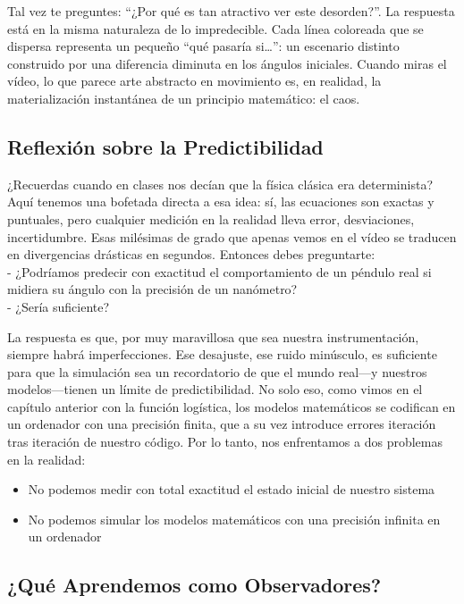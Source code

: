 \documentclass[
  11pt,
  a4paper,
  DIV=11,
  numbers=noendperiod]{scrreprt}
\providecommand{\tightlist}{%
  \setlength{\itemsep}{0pt}\setlength{\parskip}{0pt}}
\begin{document}
Tal vez te preguntes: ``¿Por qué es tan atractivo ver este desorden?''.
La respuesta está en la misma naturaleza de lo impredecible. Cada línea
coloreada que se dispersa representa un pequeño ``qué pasaría
si\ldots{}'': un escenario distinto construido por una diferencia
diminuta en los ángulos iniciales. Cuando miras el vídeo, lo que parece
arte abstracto en movimiento es, en realidad, la materialización
instantánea de un principio matemático: el caos.

\subsection{Reflexión sobre la
Predictibilidad}\label{reflexiuxf3n-sobre-la-predictibilidad}

¿Recuerdas cuando en clases nos decían que la física clásica era
determinista? Aquí tenemos una bofetada directa a esa idea: sí, las
ecuaciones son exactas y puntuales, pero cualquier medición en la
realidad lleva error, desviaciones, incertidumbre. Esas milésimas de
grado que apenas vemos en el vídeo se traducen en divergencias drásticas
en segundos. Entonces debes preguntarte:\\
- ¿Podríamos predecir con exactitud el comportamiento de un péndulo real
si midiera su ángulo con la precisión de un nanómetro?\\
- ¿Sería suficiente?

La respuesta es que, por muy maravillosa que sea nuestra
instrumentación, siempre habrá imperfecciones. Ese desajuste, ese ruido
minúsculo, es suficiente para que la simulación sea un recordatorio de
que el mundo real---y nuestros modelos---tienen un límite de
predictibilidad. No solo eso, como vimos en el capítulo anterior con la
función logística, los modelos matemáticos se codifican en un ordenador
con una precisión finita, que a su vez introduce errores iteración tras
iteración de nuestro código. Por lo tanto, nos enfrentamos a dos
problemas en la realidad:

\begin{itemize}
\tightlist
\item
  No podemos medir con total exactitud el estado inicial de nuestro
  sistema
\item
  No podemos simular los modelos matemáticos con una precisión infinita
  en un ordenador
\end{itemize}

\subsection{¿Qué Aprendemos como
Observadores?}\label{quuxe9-aprendemos-como-observadores}
\end{document}
